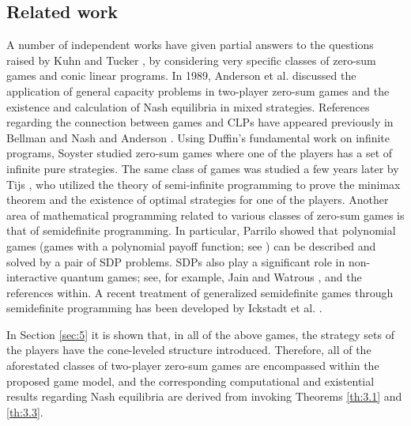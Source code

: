 \documentclass[11pt, twoside]{article}
\numberwithin{equation}{section}
\theoremstyle{definition}
\begin{document}
\vspace{-0.1cm}\subsection{Related work}\label{sec:relatedwork}\vspace{-0.2cm}

A number of independent works have given partial answers to the questions raised by Kuhn and Tucker \cite{kuhn1953contributions}, by considering very specific classes of zero-sum games and conic linear programs. In 1989, Anderson et al. \cite{anderson1989capacity} discussed the application of general capacity problems in two-player zero-sum games and the existence and calculation of Nash equilibria in mixed strategies. References regarding the connection between games and CLPs have appeared previously in Bellman \cite{bellman1966dynamic} and Nash and Anderson \cite{nash1987linear}. Using Duffin's \cite{duffin1956infinite} fundamental work on infinite programs, Soyster \cite{soyster1975semi} studied zero-sum games where one of the players has a set of infinite pure strategies. The same class of games was studied a few years later by Tijs \cite{tijs1979semi}, who utilized the theory of semi-infinite programming to prove the minimax theorem and the existence of optimal strategies for one of the players. Another area of mathematical programming related to various classes of zero-sum games is that of semidefinite programming. In particular, Parrilo \cite{parrilo2006polynomial} showed that
polynomial games (games with a polynomial payoff function; see \cite{dresher1950polynomial}) can be described and solved by a pair of SDP problems. SDPs also play a significant role in non-interactive quantum games; see, for example, Jain and Watrous \cite{jain2009parallel}, and the references within. A recent treatment of generalized semidefinite games through semidefinite programming has been developed by Ickstadt et al. \cite{ickstadt2024semidefinite}.\par
In Section \ref{sec:5} it is shown that, in all of the above games, the strategy sets of the players have the cone-leveled structure introduced. Therefore, all of the aforestated classes of two-player zero-sum games are encompassed within the proposed game model, and the corresponding computational and existential results regarding Nash equilibria are derived from invoking Theorems \ref{th:3.1} and \ref{th:3.3}.\par
\end{document}
